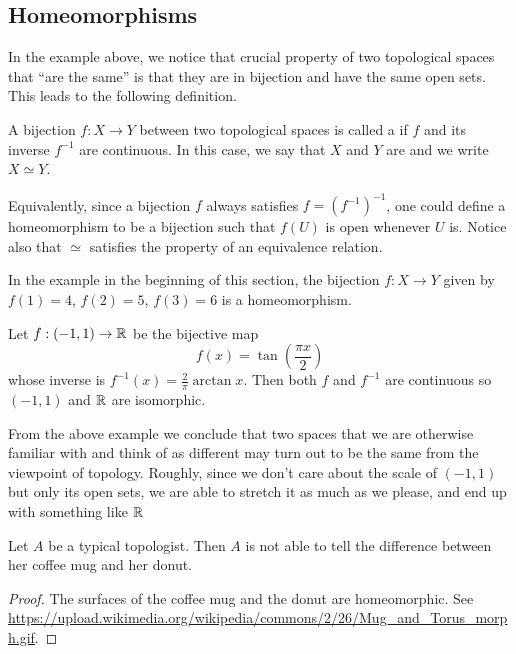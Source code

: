 \subsection{Homeomorphisms}
In the example above, we notice that crucial property of two topological spaces that ``are the same'' is that they are in bijection and have the same open sets. This leads to the following definition.
\begin{defn}
  A bijection $f : X \to Y$ between two topological spaces is called a  if $f$ and its inverse $f^{-1}$ are continuous. In this case, we say that $X$ and $Y$ are  and we write $X \simeq Y$.
\end{defn}
Equivalently, since a bijection $f$ always satisfies $f = (f^{-1})^{-1}$, one could define a homeomorphism to be a bijection such that $f(U)$ is open whenever $U$ is. Notice also that $\simeq$ satisfies the property of an equivalence relation.
\begin{example}
  In the example in the beginning of this section, the bijection $f : X \to Y$ given by $f(1) = 4$, $f(2) = 5$, $f(3) = 6$ is a homeomorphism.
\end{example}
\begin{example}
  Let $f : (-1 , 1) \to \mathbb{R}$ be the bijective map
  \[
    f(x) = \tan \left( \frac{\pi x}{2} \right)
  \]
  whose inverse is $f^{-1}(x) = \tfrac{2}{\pi} \arctan x$. Then both $f$ and $f^{-1}$ are continuous so $(-1,1)$ and $\mathbb{R}$ are isomorphic.
\end{example}
From the above example we conclude that two spaces that we are otherwise familiar with and think of as different may turn out to be the same from the viewpoint of topology. Roughly, since we don't care about the scale of $(-1,1)$ but only its open sets, we are able to stretch it as much as we please, and end up with something like $\mathbb{R}$
\begin{badjoke}
  Let $A$ be a typical topologist. Then $A$ is not able to tell the difference between her coffee mug and her donut.
\end{badjoke}
\begin{proof}
  The surfaces of the coffee mug and the donut are homeomorphic. See \url{https://upload.wikimedia.org/wikipedia/commons/2/26/Mug_and_Torus_morph.gif}.
\end{proof}

